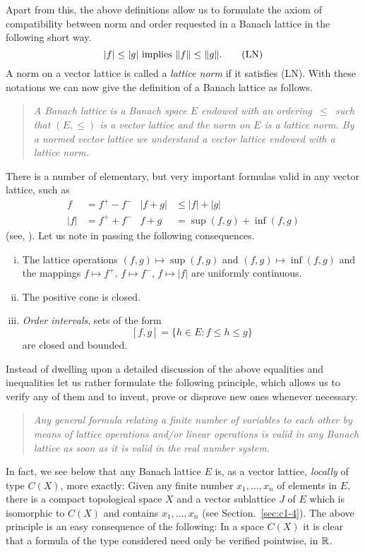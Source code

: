 Apart from this, the above definitions allow us to formulate the axiom of compatibility between norm and order requested in a Banach lattice in the following short way.
\begin{equation}\label{eq:c1-1}
	|f| \leq |g| \text{ implies $ \|f\| \leq \|g\| $.}  \tag{LN}
\end{equation}
A norm on a vector lattice is called a \emph{lattice norm} if it satisfies (LN).
With these notations we can now give the definition of a Banach lattice as follows.
\begin{quote}
\emph{A \emph{Banach lattice} is a Banach space $ E $ endowed with an ordering $ \,\leq\, $ such that $ (E,\leq) $ is a vector lattice and the norm on $ E $ is a lattice norm.
By a \emph{normed vector lattice} we understand a vector lattice endowed with a lattice norm.}
\end{quote}
There is a number of elementary, but very important formulas valid in any vector lattice, such as
\begin{align*}
f &= f^{+} - f^{-} & |f + g| &\leq |f| + |g| \\
|f| &= f^{+} + f^{-} & f + g &= \sup(f,g) + \inf(f,g)
\end{align*}
(see, \eg \citet{schaefer:1974}).
Let us note in passing the following consequences.
%
\begin{enumerate}[(i)]
\item 
The lattice operations $ (f,g) \mapsto \sup(f,g) $ and $ (f,g) \mapsto \inf(f,g) $ and the mappings $ f \mapsto f^{+} $, $ f \mapsto f^{-} $, $ f \mapsto |f| $ are uniformly continuous.

\item 
The positive cone is closed.

\item 
\emph{Order intervals}, \ie sets of the form
\[
	\left[ f,g \right] = \{ h \in E \colon f \leq h \leq g \}
\]
are closed and bounded.
\end{enumerate}
Instead of dwelling upon a detailed discussion of the above equalities and inequalities let us rather formulate the following principle, which allows us to verify any of them and to invent, prove or disprove new ones whenever necessary.
\begin{quote}
\emph{Any general formula relating a finite number of \emph{variables} to each other by means of lattice operations and/or linear operations is valid in any Banach lattice as soon as it is valid in the real number system.}
\end{quote}
In fact, we see below that any Banach lattice $ E $ is, as a vector lattice, \emph{locally} of type $ C(X) $, more exactly:
Given any finite number $ x_{1},\ldots,x_{n} $ of elements in $ E $, there is a compact topological space $ X $ and a vector sublattice $ J $ of $ E $ which is isomorphic to $ C(X) $ and contains $ x_{1},\ldots,x_{n} $ (see Section.~\ref{sec:c1-4}).
The above principle is an easy consequence of the following:
In a space $ C(X) $ it is clear that a formula of the type considered need only be verified pointwise, \ie  in $ \mathbb{R} $.

